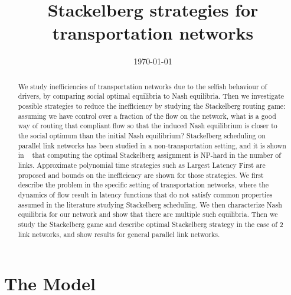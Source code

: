 

\usepackage{amsmath}
\usepackage{amsfonts}
\usepackage[utf8]{inputenc}
\usepackage{graphicx}
\usepackage{hyperref}


\title{Stackelberg strategies for transportation networks}
\date{\today}



\maketitle


\begin{abstract}
We study inefficiencies of transportation networks due to the selfish behaviour of drivers, by comparing social optimal equilibria to Nash equilibria. Then we investigate possible strategies to reduce the inefficiency by studying the Stackelberg routing game: assuming we have control over a fraction of the flow on the network, what is a good way of routing that compliant flow so that the induced Nash equilibrium is closer to the social optimum than the initial Nash equilibrium? Stackelberg scheduling on parallel link networks has been studied in a non-transportation setting, and it is shown in ~\cite{rou01} that computing the optimal Stackelberg assignment is NP-hard in the number of links. Approximate polynomial time strategies such as Largest Latency First are proposed and bounds on the inefficiency are shown for those strategies.
We first describe the problem in the specific setting of transportation networks, where the dynamics of flow result in latency functions that do not satisfy common properties assumed in the literature studying Stackelberg scheduling. We then characterize Nash equilibria for our network and show that there are multiple such equilibria. Then we study the Stackelberg game and describe optimal Stackelberg strategy in the case of 2 link networks, and show results for general parallel link networks.
\end{abstract}


\section{The Model}
